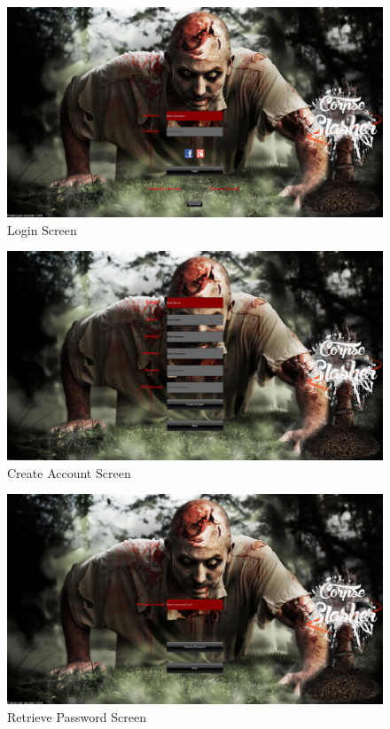 \documentclass[letterpaper]{article}
\begin{document}
		\begin{figure}[H]
		\centering
		\includegraphics[width=130mm]		{GUI_ScreenShots/LoginScreen.jpg}
		\caption{Login Screen}
		\end{figure}
		

		
		\begin{figure}[H]
		\centering
		\includegraphics[width=130mm]{GUI_ScreenShots/CreateAccount.jpg}
		\caption{Create Account Screen}
		\end{figure}
		

			
		\begin{figure}[H]
		\centering
		\includegraphics[width=130mm]{GUI_ScreenShots/RetrievePassword.jpg}
		\caption{Retrieve Password Screen}
		\end{figure}
		
\end{document}
